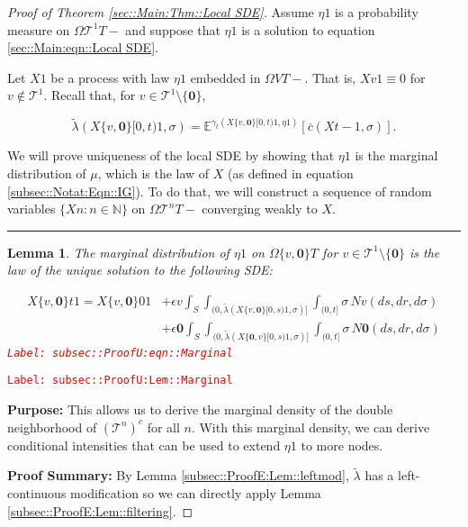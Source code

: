 \documentclass[12pt]{article}
\newcommand{\mb}{\mathbb}
\newcommand{\mc}{\mathcal}
\newcommand{\ov}{\overline}
\newcommand{\ep}{\epsilon}
\newcommand{\tr}{\textcolor{red}}
\newcommand{\labe}[1]{\tr{\texttt{Label: #1}}}
\newcommand{\purpose}{\textbf{Purpose: }}
\newcommand{\pfsum}{\textbf{Proof Summary: }}
\newcommand{\ind}{\hspace{24pt}}
\newcommand{\lin}{\rule{\linewidth}{0.4 pt}}
\newcommand{\exmu}[2]{\mb{E}^{#1}\left[#2\right]}	%
\renewcommand{\root}{\mathbf{0}}				%
\renewcommand{\v}{v}							%
\renewcommand{\S}{S}							%
\newcommand{\s}{\sigma}							%
\newcommand{\ev}{\ep}							%
\newcommand{\T}{T}								%
\renewcommand{\t}{t}							%
\renewcommand{\tt}{s}							%
\newcommand{\X}{X}								%
\newcommand{\IGrg}{\ov{c}}						%
\newcommand{\tree}{\mc{T}}						%
\newcommand{\sln}[1]{^{#1}}						%
\newcommand{\poiss}{N}							%
\renewcommand{\r}{r}							%
\newcommand{\alt}[1]{\widetilde{#1}}			%
\newcommand{\m}{\mu}							%
\newcommand{\mmm}{\eta}							%
\newcommand{\cm}{\gamma}						%
\newcommand{\crate}{\alt{\lambda}}				%
\newtheorem{lem}[thms]{Lemma}
\begin{document}
\begin{proof}[Proof of Theorem \ref{sec::Main:Thm::Local SDE}]

Assume \(\mmm{}{}{1}\) is a probability measure on \(\Omega{\tree\sln{1}}{\T-}\) and suppose that \(\mmm{}{}{1}\) is a solution to equation \eqref{sec::Main:eqn::Local SDE}.

\ind Let \(\X{}{}{1}\) be a process with law \(\mmm{}{}{1}\) embedded in \(\Omega{ V}{\T-}\). That is, \(\X{\v}{}{1} \equiv 0\) for \(\v \notin \tree\sln{1}\). Recall that, for \(\v \in \tree\sln{1}\setminus\{\root\}\),

\[\crate{}{}(\X{\{\v,\root\}}{[0,\t)}{1},\s) = \exmu{\cm_\t(\X{\{\v,\root\}}{[0,\t)}{1},\mmm{}{}{1})}{\IGrg{}(\X{}{\t-}{1},\s)}.\]

\ind We will prove uniqueness of the local SDE by showing that \(\mmm{}{}{1}\) is the marginal distribution of \(\m{}{}{}\), which is the law of \(\X{}{}\) (as defined in equation \eqref{subsec::Notat:Eqn::IG}). To do that, we will construct a sequence of random variables \(\{\X{}{}{n}:n\in\mb{N}\}\) on \(\Omega{\tree\sln{n}}{\T-}\) converging weakly to \(\X{}{}\). 

\lin

\begin{lem}
The marginal distribution of \(\mmm{}{}{1}\) on \(\Omega{\{\v,\root\}}{\T}\) for \(\v \in \tree\sln{1}\setminus\{\root\}\) is the law of the unique solution to the following SDE:

\begin{align}
\X{\{\v,\root\}}{\t}{1} = \X{\{\v,\root\}}{0}{1} &+ \ev{\v}\int_\S\int_{(0,\crate{}{}(\X{\{\v,\root\}}{[0,\tt)}{1},\s)]}\int_{(0,t]}\s\,\poiss{\v}(d\tt,d\r,d\s)\nonumber\\
&+ \ev{\root}\int_\S\int_{(0,\crate{}{}(\X{\{\root,\v\}}{[0,\tt)}{1},\s)]}\int_{(0,t]}\s\,\poiss{\root}(d\tt,d\r,d\s)
\label{subsec::ProofU:eqn::Marginal}
\end{align}
\labe{subsec::ProofU:eqn::Marginal}
\label{subsec::ProofU:Lem::Marginal}
\end{lem}
\labe{subsec::ProofU:Lem::Marginal}

\purpose This allows us to derive the marginal density of the double neighborhood of \((\tree\sln{n})^c\) for all \(n\). With this marginal density, we can derive conditional intensities that can be used to extend \(\mmm{}{}{1}\) to more nodes.

\pfsum By Lemma \ref{subsec::ProofE:Lem::leftmod}, \(\crate{}{}\) has a left-continuous modification so we can directly apply Lemma \ref{subsec::ProofE:Lem::filtering}.


\end{proof}
\end{document}
